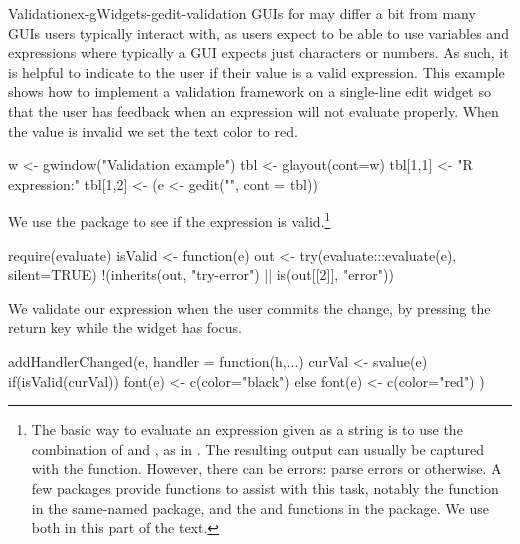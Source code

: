 \begin{example}{Validation}{ex-gWidgets-gedit-validation}
GUIs for \R\/ may differ a bit from many GUIs users typically
interact with, as \R\/ users expect to be able to use variables and
expressions where typically a GUI expects just characters or
numbers. As such, it is helpful to indicate to the user if their value
is a valid expression. This example shows how to implement a
validation framework on a single-line edit widget so that the user has
feedback when an expression will not evaluate properly.  When the
value is invalid we set the text color to red.


\begin{Schunk}
\begin{Sinput}
 w <- gwindow("Validation example")
 tbl <- glayout(cont=w)
 tbl[1,1] <- "R expression:"
 tbl[1,2] <- (e <- gedit("", cont = tbl))
\end{Sinput}
\end{Schunk}


We use the  package to see
if the expression is valid.\footnote{The basic way to evaluate an
  \R{} expression given as a string is to use the combination of
   and , as in
  . The resulting output can usually be
  captured with the  function. However, there
  can be errors: parse errors or otherwise. A few packages provide
  functions to assist with this task, notably the 
  function in the same-named  package, and the
   and  functions in the
   package. We use both in this part of the text.}
\begin{Schunk}
\begin{Sinput}
 require(evaluate)
 isValid <- function(e) {
   out <- try(evaluate:::evaluate(e), silent=TRUE)
   !(inherits(out, "try-error") ||  is(out[[2]], "error"))
 }
\end{Sinput}
\end{Schunk}
%

We validate our expression when the user commits the change, by
pressing the return key while the widget has focus. 


\begin{Schunk}
\begin{Sinput}
 addHandlerChanged(e, handler = function(h,...) {
   curVal <- svalue(e)
   if(isValid(curVal)) {
     font(e) <- c(color="black")
   } else {
     font(e) <- c(color="red")
   }
 })
\end{Sinput}
\end{Schunk}

\end{example}


